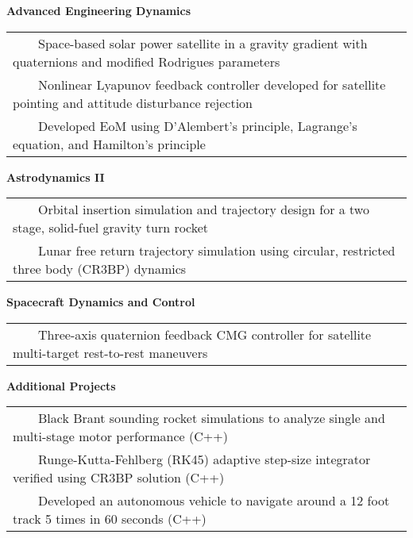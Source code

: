 \documentclass[overlapped, 11pt]{res}
\newcommand{\tabitem}{~~\textbullet~~}
\begin{document}
\begin{resume}
\begin{itemize}
            \textbf{Advanced Engineering Dynamics}\\
                \begin{tabular}{l}
                    \tabitem Space-based solar power satellite in a gravity gradient with quaternions and modified Rodrigues parameters\\
                    \tabitem Nonlinear Lyapunov feedback controller developed for satellite pointing and attitude disturbance rejection\\
                    \tabitem Developed EoM using D'Alembert's principle, Lagrange's equation, and Hamilton's principle\\
                \end{tabular}
                
            \textbf{Astrodynamics II} \\
                \begin{tabular}{l}
                    \tabitem Orbital insertion simulation and trajectory design for a two stage, solid-fuel gravity turn rocket\\
                    \tabitem Lunar free return trajectory simulation using circular, restricted three body (CR3BP) dynamics\\
                \end{tabular}
            
            \textbf{Spacecraft Dynamics and Control} \\
                \begin{tabular}{l}
                    \tabitem Three-axis quaternion feedback CMG controller for satellite multi-target rest-to-rest maneuvers\\
                \end{tabular}
                
            \textbf{Additional Projects} \\
                \begin{tabular}{l}
                    \tabitem Black Brant sounding rocket simulations to analyze single and multi-stage motor performance (C++)\\
                    \tabitem Runge-Kutta-Fehlberg (RK45) adaptive step-size integrator verified using CR3BP solution (C++)\\
                    \tabitem Developed an autonomous vehicle to navigate around a 12 foot track 5 times in 60 seconds (C++)\\
                \end{tabular}


\end{itemize}
\end{resume}
\end{document}
